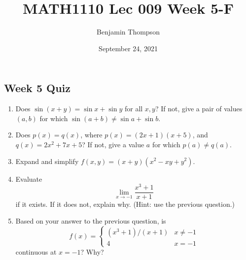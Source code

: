 \documentclass[12pt,a4paper]{article}
\title{MATH1110 Lec 009 Week 5-F}
\author{Benjamin Thompson}
\date{September 24, 2021}
\newcommand{\vspaceC}{\vspace{3cm}}
\begin{document}
\subsection*{Week 5 Quiz}
\begin{enumerate}
    \item Does $\sin(x+y) = \sin x + \sin y$ for all $x,y$? If not, give a pair of values $(a,b)$ for which $\sin(a + b) \ne \sin a + \sin b$.
    \vspaceC
    \item Does $p(x) = q(x)$, where $p(x) = (2x + 1)(x + 5)$, and $q(x) = 2x^2 + 7x + 5$? If not, give a value $a$ for which $p(a) \ne q(a)$.
    \vspaceC
    \item Expand and simplify $f(x,y) = (x + y)(x^2 - xy + y^2)$.
    \vspace{4cm}
    \item Evaluate
    \[
        \lim_{x \rightarrow -1} \frac{x^3 + 1}{x+1}
    \]
    if it exists. If it does not, explain why. (Hint: use the previous question.)
    \vspace{4cm}
    \item Based on your answer to the previous question, is
    \[
    f(x) = \begin{cases}
        (x^3 + 1)/(x+1) & x \ne -1 \\
        4               & x = -1
    \end{cases}
    \]
    continuous at $x=-1$? Why?
\end{enumerate}

\newpage
\end{document}
